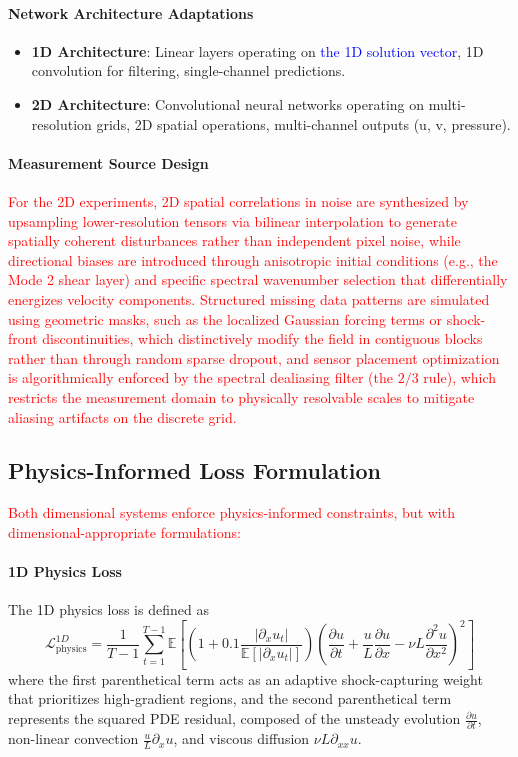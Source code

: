 \documentclass[preprint,12pt,authoryear]{elsarticle}
\begin{document}
\paragraph{Network Architecture Adaptations}
\begin{itemize}
    \item \textbf{1D Architecture}: Linear layers operating on \textcolor{blue}{the 1D solution vector}, 1D convolution for filtering, single-channel predictions.
    \item \textbf{2D Architecture}: Convolutional neural networks operating on multi-resolution grids, 2D spatial operations, multi-channel outputs (u, v, pressure).
\end{itemize}

\paragraph{Measurement Source Design}
\textcolor{red}{For the 2D experiments, 2D spatial correlations in noise are synthesized by upsampling lower-resolution tensors via bilinear interpolation to generate spatially coherent disturbances rather than independent pixel noise, while directional biases are introduced through anisotropic initial conditions (e.g., the Mode 2 shear layer) and specific spectral wavenumber selection that differentially energizes velocity components. Structured missing data patterns are simulated using geometric masks, such as the localized Gaussian forcing terms or shock-front discontinuities, which distinctively modify the field in contiguous blocks rather than through random sparse dropout, and sensor placement optimization is algorithmically enforced by the spectral dealiasing filter (the $2/3$ rule), which restricts the measurement domain to physically resolvable scales to mitigate aliasing artifacts on the discrete grid.}


\subsection{Physics-Informed Loss Formulation}
\label{subsection:physics_informed_loss_formulation}
\textcolor{red}{Both dimensional systems enforce physics-informed constraints, but with dimensional-appropriate formulations:}

\paragraph{1D Physics Loss}

\noindent The 1D physics loss is defined as
\[
\mathcal{L}_{\text{physics}}^{1D} = \frac{1}{T-1}\sum_{t=1}^{T-1} \mathbb{E}\left[ \left(1 + 0.1\frac{|\partial_x u_t|}{\mathbb{E}[|\partial_x u_t|]}\right) \left(\frac{\partial u}{\partial t} + \frac{u}{L}\frac{\partial u}{\partial x} - \nu L\frac{\partial^2 u}{\partial x^2}\right)^2 \right]
\]
where the first parenthetical term acts as an adaptive shock-capturing weight that prioritizes high-gradient regions, and the second parenthetical term represents the squared PDE residual, composed of the unsteady evolution $\frac{\partial u}{\partial t}$, non-linear convection $\frac{u}{L}\partial_x u$, and viscous diffusion $\nu L \partial_{xx} u$.
\end{document}
